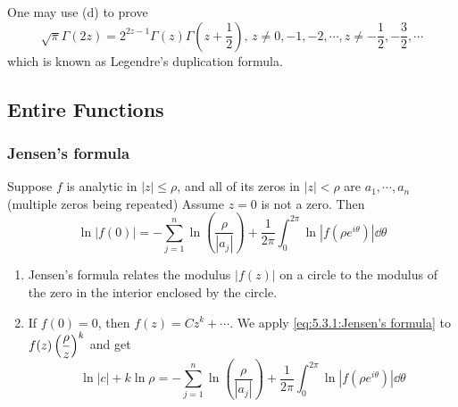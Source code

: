 One may use (d) to prove 
\begin{equation}
    \sqrt{\pi}\Gamma(2z)=2^{2z-1}\Gamma(z)\Gamma(z+\frac{1}{2}),\,z\neq 0,-1,-2,\cdots,z\neq -\frac{1}{2},-\frac{3}{2},\cdots
\end{equation}
which is known as Legendre's duplication formula.

\subsection{Entire Functions}
\subsubsection{Jensen's formula}
\begin{theorem}\label{thm:5.3.1:Jensen's formula}
    Suppose  $ f  $ is analytic in  $ |z| \leq \rho $, and all of its zeros in  $ |z|<\rho $ are  $ a_1,\cdots,a_n $ (multiple zeros being repeated) Assume  $ z=0  $ is not a zero. Then 
    \begin{equation}
        \ln |f(0)|=-\sum_{j=1}^n\ln\left(\frac{\rho}{|a_j|}\right)+\frac{1}{2\pi }\int_0^{2\pi}\ln|f(\rho e^{i\theta})|\dd\theta\label{eq:5.3.1:Jensen's formula}
    \end{equation}  
\end{theorem}
\begin{remark}
    \begin{enumerate}[label=(\arabic*)]
        \item Jensen's formula relates the modulus  $ |f(z)| $ on a circle to the modulus of the zero in the interior enclosed by the circle.
        \item If  $ f(0)=0 $, then  $ f(z)=Cz^k+\cdots $. We apply  \eqref{eq:5.3.1:Jensen's formula} to  $ f(z)\displaystyle\left(\frac{\rho}{z}\right)^k $ and get 
        \begin{equation}
            \ln |c|+k\ln \rho=-\sum_{j=1}^n\ln\left(\frac{\rho}{|a_j|}\right)+\frac{1}{2\pi }\int_0^{2\pi}\ln|f(\rho e^{i\theta})|\dd\theta
        \end{equation}
    \end{enumerate}

\end{remark}
